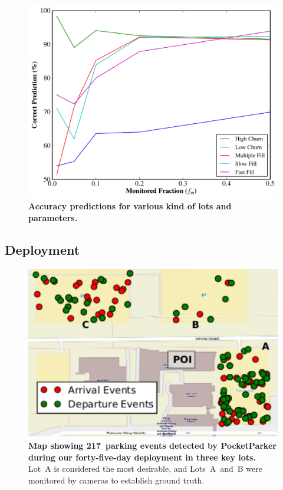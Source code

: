 \documentclass{sigchi}
\begin{document}
\begin{figure}[t]
\centering
\includegraphics[width=\columnwidth]{./simulator/figures/accuracy_graph.pdf}

\caption{\textbf{Accuracy predictions for various kind of lots and parameters.}}
\label{fig-accuracy}
\end{figure}

\newpage
\vspace*{-0.4in}
\subsection{Deployment}

\begin{figure}[t]
\centering
\includegraphics[width=\columnwidth]{./figures/smallEventsOnThreeParkingLot.pdf}

\caption{\textbf{Map showing 217~parking events detected by PocketParker
during our forty-five-day deployment in three key lots.} Lot~A is considered
the most desirable, and Lots~A~and~B were monitored by cameras to establish
ground truth.}

\label{fig-events}
\end{figure}
\end{document}
